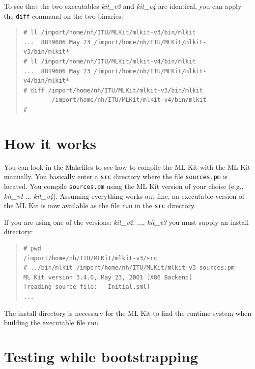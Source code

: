 \documentclass[12pt]{book}
\begin{document}
To see that the two executables \emph{kit\_v3} and \emph{kit\_v4} are
identical, you can apply the \texttt{diff} command on the two
binaries:

\begin{small}
\begin{quote}
\begin{verbatim}
# ll /import/home/nh/ITU/MLKit/mlkit-v3/bin/mlkit 
...  8819606 May 23 /import/home/nh/ITU/MLKit/mlkit-v3/bin/mlkit*
# ll /import/home/nh/ITU/MLKit/mlkit-v4/bin/mlkit
...  8819606 May 23 /import/home/nh/ITU/MLKit/mlkit-v4/bin/mlkit*
# diff /import/home/nh/ITU/MLKit/mlkit-v3/bin/mlkit 
        /import/home/nh/ITU/MLKit/mlkit-v4/bin/mlkit
#
\end{verbatim}
\end{quote}
\end{small}

\section{How it works}

You can look in the Makefiles to see how to compile the ML Kit with
the ML Kit manually. You basically enter a \texttt{src} directory
where the file \texttt{sources.pm} is located. You compile
\texttt{sources.pm} using the ML Kit version of your choise (e.g.,
\emph{kit\_v1} $\ldots$ \emph{kit\_v4}). Assuming everything works out
fine, an executable version of the ML Kit is now available as the file
{\tt run} in the \texttt{src} directory.

If you are using one of the versions: \emph{kit\_v2}, $\ldots$,
\emph{kit\_v3} you must supply an install directory:

\begin{small}
\begin{quote}
\begin{verbatim}
# pwd
/import/home/nh/ITU/MLKit/mlkit-v3/src
# ../bin/mlkit /import/home/nh/ITU/MLKit/mlkit-v3 sources.pm
ML Kit version 3.4.0, May 23, 2001 [X86 Backend]
[reading source file:   Initial.sml]
...
\end{verbatim}
\end{quote}
\end{small}

The install directory is necessary for the ML Kit to find the runtime
system when building the executable file \texttt{run}.

\section{Testing while bootstrapping}
\end{document}
